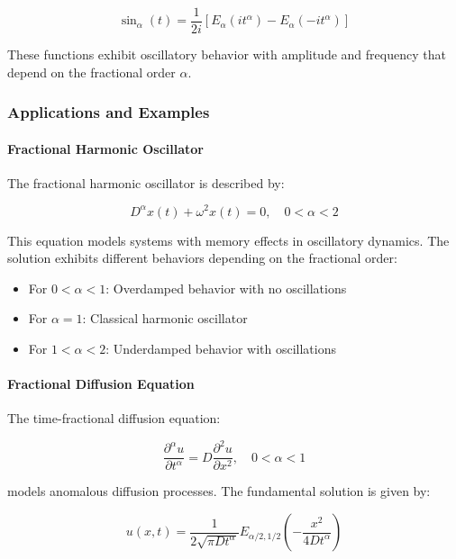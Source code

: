 \begin{equation}
\sin_{\alpha}(t) = \frac{1}{2i}[E_{\alpha}(it^{\alpha}) - E_{\alpha}(-it^{\alpha})]
\end{equation}

These functions exhibit oscillatory behavior with amplitude and frequency that depend on the fractional order $\alpha$.

\subsubsection{Applications and Examples}

\paragraph{Fractional Harmonic Oscillator}

The fractional harmonic oscillator is described by:

\begin{equation}
D^{\alpha} x(t) + \omega^2 x(t) = 0, \quad 0 < \alpha < 2
\end{equation}

This equation models systems with memory effects in oscillatory dynamics. The solution exhibits different behaviors depending on the fractional order:

\begin{itemize}
    \item For $0 < \alpha < 1$: Overdamped behavior with no oscillations
    \item For $\alpha = 1$: Classical harmonic oscillator
    \item For $1 < \alpha < 2$: Underdamped behavior with oscillations
\end{itemize}

\paragraph{Fractional Diffusion Equation}

The time-fractional diffusion equation:

\begin{equation}
\frac{\partial^{\alpha} u}{\partial t^{\alpha}} = D \frac{\partial^2 u}{\partial x^2}, \quad 0 < \alpha < 1
\end{equation}

models anomalous diffusion processes. The fundamental solution is given by:

\begin{equation}
u(x,t) = \frac{1}{2\sqrt{\pi D t^{\alpha}}} E_{\alpha/2,1/2}\left(-\frac{x^2}{4D t^{\alpha}}\right)
\end{equation}


